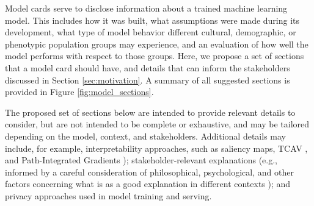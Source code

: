 Model cards serve to disclose information about a trained machine learning model. This includes how it was built, what assumptions were made during its development, what type of model behavior different cultural, demographic, or phenotypic population groups may experience, and an evaluation of how well the model performs with respect to those groups. Here, we propose a set of sections that a model card should have, and details that can inform the stakeholders discussed in Section \ref{sec:motivation}.  A summary of all suggested sections is provided in Figure \ref{fig:model_sections}.

The proposed set of sections below are intended to provide relevant details to consider, but are not intended to be complete or exhaustive, and may be tailored depending on the model, context, and stakeholders.  Additional details may include, for example, interpretability approaches, such as saliency maps, TCAV \cite{KimEtAl2018}, and Path-Integrated Gradients \cite{PathIntegratedGradients2017,PathIntegratedGradients2018}); stakeholder-relevant explanations (e.g., informed by a careful consideration of philosophical, psychological, and other factors concerning what is as a good explanation in different contexts \cite{GoogleResponsiblePractices}); and privacy approaches used in model training and serving.

